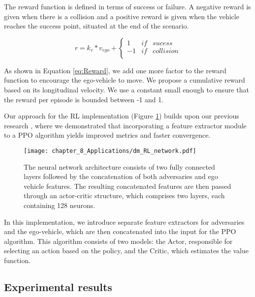 The reward function is defined in terms of success or failure. A negative reward is given when there is a collision and a positive reward is given when the vehicle reaches the success point, situated at the end of the scenario.

\begin{equation}
	r = k_v * v_{ego} + \left\lbrace\begin{array}{lcc}
		1 & if & sucess \\ 
		-1 & if & collision \\
	\end{array}\right.
	\label{eq:Reward}
\end{equation}

As shown in Equation \ref{eq:Reward}, we add one more factor to the reward function to encourage the ego-vehicle to move. We propose a cumulative reward based on its longitudinal velocity. We use a constant small enough to ensure that the reward per episode is bounded between -1 and 1.

Our approach for the RL implementation (Figure \ref{fig:chapter_8_Applications/dm_RL_network}) builds upon our previous research \cite{Gutierrez2022}, where we demonstrated that incorporating a feature extractor module to a PPO algorithm yields improved metrics and faster convergence. 

\begin{figure}[h]
	\centering
	\texttt{[image: chapter\_8\_Applications/dm\_RL\_network.pdf]}
	\caption{The neural network architecture consists of two fully connected layers followed by the concatenation of both adversaries and ego vehicle features. The resulting concatenated features are then passed through an actor-critic structure, which comprises two layers, each containing 128 neurons.}	
	\label{fig:chapter_8_Applications/dm_RL_network}
\end{figure}

In this implementation, we introduce separate feature extractors for adversaries and the ego-vehicle, which are then concatenated into the input for the PPO algorithm. This algorithm consists of two models: the Actor, responsible for selecting an action based on the policy, and the Critic, which estimates the value function.

\subsection{Experimental results}
\label{subsec:8_decision_making_experimental_results}

